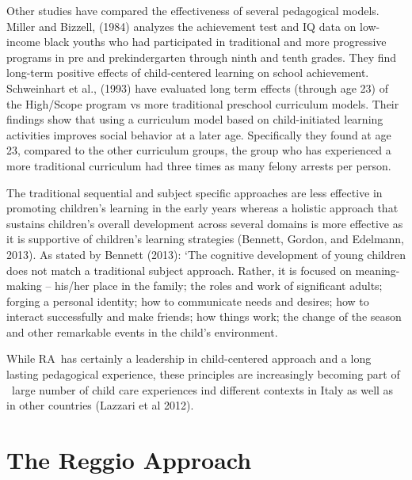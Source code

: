 \documentclass[12pt]{article}
\begin{document}
Other studies have compared the effectiveness of several pedagogical models.
Miller and Bizzell, (1984) analyzes the achievement test and IQ data on
low-income black youths who had participated in traditional and more
progressive programs in pre and prekindergarten through ninth and tenth
grades. They find long-term positive effects of child-centered learning on
school achievement. Schweinhart et al., (1993) have evaluated long term
effects (through age 23) of the High/Scope program vs more traditional
preschool curriculum models. Their findings show that using a curriculum
model based on child-initiated learning activities improves social behavior
at a later age. Specifically they found at age 23, compared to the other
curriculum groups, the group who has experienced a more traditional
curriculum had three times as many felony arrests per person.

The traditional sequential and subject specific approaches are less
effective in promoting children's learning in the early years whereas a
holistic approach that sustains children's overall development across
several domains is more effective as it is supportive of children's learning
strategies (Bennett, Gordon, and Edelmann, 2013). As stated by Bennett
(2013): `The cognitive development of young children does not match a
traditional subject approach. Rather, it is focused on meaning-making --
his/her place in the family; the roles and work of significant adults;
forging a personal identity; how to communicate needs and desires; how to
interact successfully and make friends; how things work; the change of the
season and other remarkable events in the child's environment.

While RA\ has certainly a leadership in child-centered approach and a long
lasting pedagogical experience, these principles are increasingly becoming
part of \ large number of child care experiences ind different contexts in
Italy as well as in other countries (Lazzari et al 2012). 

%

\section{The Reggio Approach}

\label{sec:background}
\end{document}
